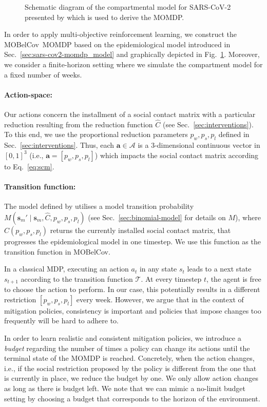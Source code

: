 \documentclass{article}
\newcommand{\mdpactionspace}{\mathcal{A}}
\newcommand{\mdptransition}{\mathcal{T}}
\newcommand{\state}{s}
\newcommand{\mdpstate}{\mathbf{s}}
\newcommand{\action}{a}
\newcommand{\mdpaction}{\mathbf{a}}
\newcommand{\momdpname}{MOBelCov}
\begin{document}
\begin{figure}[t!]
    \caption{Schematic diagram of the compartmental model for SARS-CoV-2 presented by \citet{abrams2021modelling} which is used to derive the MOMDP.}
    \label{fig:compartment_model}
\end{figure}
In order to apply multi-objective reinforcement learning, we construct the \momdpname\ MOMDP based on the epidemiological model introduced in Sec.~\ref{sec:sars-cov2-momdp_model} and graphically depicted in Fig.~\ref{fig:compartment_model}. Moreover, we consider a finite-horizon setting where we simulate the compartment model for a fixed number of weeks.

\paragraph{Action-space:} Our actions concern the installment of a social contact matrix with a particular reduction resulting from the reduction function $\hat{C}$ (see Sec.~\ref{sec:interventions}). To this end, we use the proportional reduction parameters $p_w, p_s, p_l$ defined in Sec.~\ref{sec:interventions}. Thus, each $\mdpaction \in \mdpactionspace$ is a 3-dimensional continuous vector in $[0,1]^3$ (i.e., $\mdpaction = [p_{w}, p_{s}, p_{l}]$) which impacts the social contact matrix according to Eq.~\ref{eq:scm}.

\paragraph{Transition function:} The model defined by \citet{abrams2021modelling} utilises a model transition probability $M(\mdpstate_m' \mid \mdpstate_m, \hat{C}, p_{w}, p_{s}, p_{l})$ (see Sec.~\ref{sec:binomial-model} for details on $M$), where $\hat{C}(p_{w}, p_{s}, p_{l})$ returns the currently installed social contact matrix, that progresses the epidemiological model in one timestep.
We use this function as the transition function in \momdpname.

In a classical MDP, executing an action $\action_t$ in any state $\state_t$ leads to a next state $\state_{t+1}$ according to the transition function $\mdptransition$. At every timestep $t$, the agent is free to choose the action to perform. In our case, this potentially results in a different restriction $[p_{w}, p_{s}, p_{l}]$ every week. However, we argue that in the context of mitigation policies, consistency is important and policies that impose changes too frequently will be hard to adhere to.

In order to learn realistic and consistent mitigation policies, we introduce a \emph{budget} regarding the number of times a policy can change its actions until the terminal state of the MOMDP is reached. Concretely, when the action changes, i.e., if the social restriction proposed by the policy is different from the one that is currently in place, we reduce the budget by one. We only allow action changes as long as there is budget left. We note that we can mimic a no-limit budget setting by choosing a budget that corresponds to the horizon of the environment.
\end{document}
